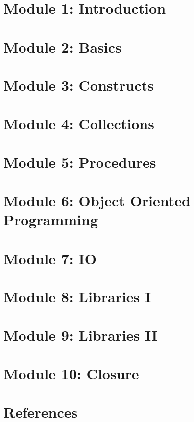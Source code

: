 \section[Intro]{Module 1: Introduction}



\section[Basics]{Module 2: Basics}



 
\section[Constructs]{Module 3: Constructs}



\section[Seq]{Module 4: Collections}


  
\section[Procedures]{Module 5: Procedures}


 
\section[OOP]{Module 6: Object Oriented Programming}

 
\section[IO]{Module 7: IO}

 
\section[LibI]{Module 8: Libraries I}


 
\section[LibII]{Module 9: Libraries II}


 
\section[End]{Module 10: Closure}



 
\section[Refs]{References}


